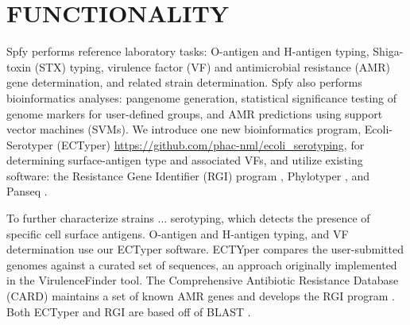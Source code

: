 \documentclass[a4,center,fleqn]{NAR}
\begin{document}

\enlargethispage{-65.1pt}



\section{FUNCTIONALITY}
Spfy performs reference laboratory tasks: O-antigen and H-antigen typing, Shiga-toxin (STX) typing,  virulence factor (VF) and antimicrobial resistance (AMR) gene determination, and related strain determination.
Spfy also performs bioinformatics analyses: pangenome generation, statistical significance testing of genome markers for user-defined groups, and AMR predictions using support vector machines (SVMs).
We introduce one new bioinformatics program, Ecoli-Serotyper (ECTyper) \url{https://github.com/phac-nml/ecoli_serotyping}, for determining surface-antigen type and associated VFs, and utilize existing software: the Resistance Gene Identifier (RGI) program \cite{mcarthur2013comprehensive}, Phylotyper \cite{whiteside2017phylotyper}, and Panseq \cite{laing2010pan}.

To further characterize strains ... serotyping, which detects the presence of specific cell surface antigens.
O-antigen and H-antigen typing, and VF determination use our ECTyper software.
ECTYper compares the user-submitted genomes against a curated set of sequences, an approach originally implemented in the VirulenceFinder \cite{joensen2014real} tool.
The Comprehensive Antibiotic Resistance Database (CARD) \cite{mcarthur2013comprehensive} maintains a set of known AMR genes and develops the RGI program .
Both ECTyper and RGI are based off of BLAST \cite{pmid2231712}.
\end{document}
